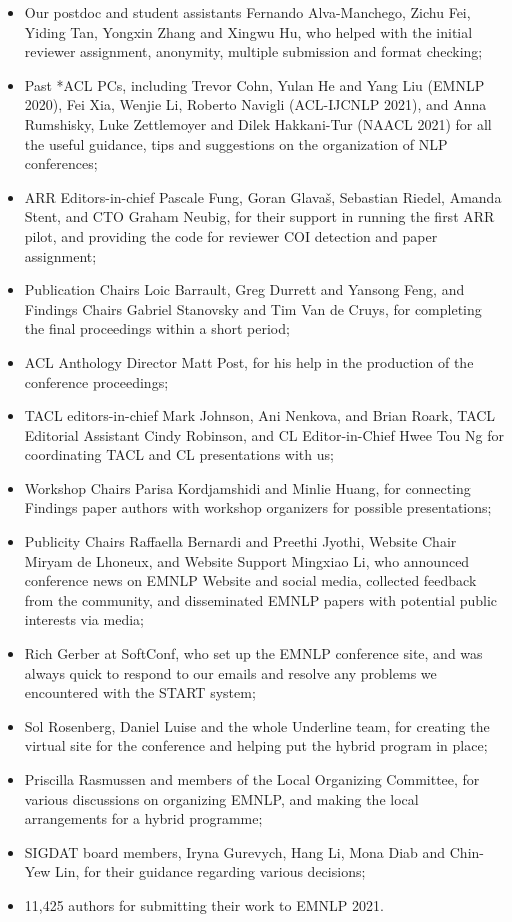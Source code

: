 \begin{itemize}
\item Our postdoc and student assistants Fernando Alva-Manchego, Zichu Fei, Yiding Tan, Yongxin Zhang and Xingwu Hu, who helped with the initial reviewer assignment, anonymity, multiple submission and format checking;
\item Past *ACL PCs, including Trevor Cohn, Yulan He and Yang Liu (EMNLP 2020), Fei Xia, Wenjie Li, Roberto Navigli (ACL-IJCNLP 2021), and Anna Rumshisky, Luke Zettlemoyer and Dilek Hakkani-Tur (NAACL 2021) for all the useful guidance, tips and suggestions on the organization of NLP conferences;
\item ARR Editors-in-chief Pascale Fung, Goran Glavaš, Sebastian Riedel, Amanda Stent, and CTO Graham Neubig, for their support in running the first ARR pilot, and providing the code for reviewer COI detection and paper assignment;
\item Publication Chairs Loic Barrault, Greg Durrett and Yansong Feng, and Findings Chairs Gabriel Stanovsky and Tim Van de Cruys, for completing the final proceedings within a short period;
\item ACL Anthology Director Matt Post, for his help in the production of the conference proceedings;
\item TACL editors-in-chief Mark Johnson, Ani Nenkova, and Brian Roark, TACL Editorial Assistant Cindy Robinson, and CL Editor-in-Chief Hwee Tou Ng for coordinating TACL and CL presentations with us;
\item Workshop Chairs Parisa Kordjamshidi and Minlie Huang, for connecting Findings paper authors with workshop organizers for possible presentations;
\item Publicity Chairs Raffaella Bernardi and Preethi Jyothi, Website Chair Miryam de Lhoneux, and Website Support Mingxiao Li, who announced conference news on EMNLP Website and social media, collected feedback from the community, and disseminated EMNLP papers with potential public interests via media;
\item Rich Gerber at SoftConf, who set up the EMNLP conference site, and was always quick to respond to our emails and resolve any problems we encountered with the START system;
\item Sol Rosenberg, Daniel Luise and the whole Underline team, for creating the virtual site for the conference and helping put the hybrid program in place;
\item Priscilla Rasmussen and members of the Local Organizing Committee, for various discussions on organizing EMNLP, and making the local arrangements for a hybrid programme;
\item SIGDAT board members, Iryna Gurevych, Hang Li, Mona Diab and Chin-Yew Lin, for their guidance regarding various decisions;
\item 11,425 authors for submitting their work to EMNLP 2021.

\end{itemize}

